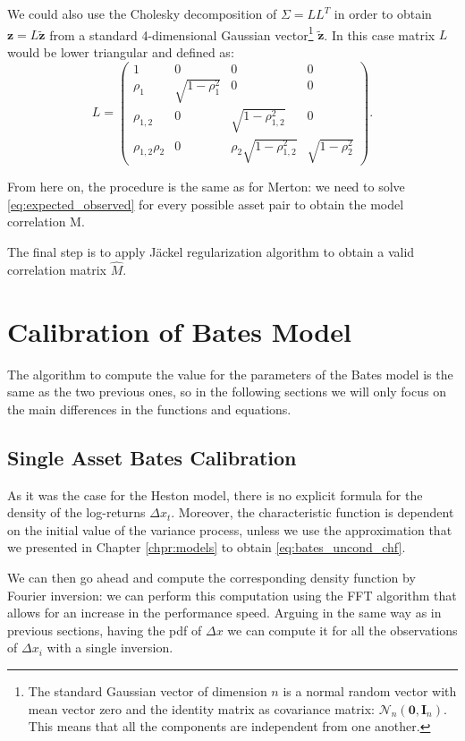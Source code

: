 We could also use the Cholesky decomposition of $\Sigma = L L^T$ in order to obtain $\mathbf{z} = L \mathbf{\tilde{z}}$ from a standard 4-dimensional Gaussian vector\footnote{The standard Gaussian vector of dimension $n$ is a normal random vector with mean vector zero and the identity matrix as covariance matrix: $\mathcal{N}_n (\mathbf{0}, \mathbf{I}_n)$. This means that all the components are independent from one another.} $\mathbf{\tilde{z}}$. In this case matrix $L$ would be lower triangular and defined as:
\begin{equation}
	L = \begin{pmatrix}
	1&0&0&0\\
	\rho_1 & \sqrt{1- \rho_1^2} &0&0\\
	\rho_{1,2} &0&\sqrt{1-\rho_{1,2}^2}&0\\
	\rho_{1,2}\rho_2 & 0& \rho_2 \sqrt{1-\rho_{1,2}^2}&\sqrt{1- \rho_2^2} 
	\end{pmatrix}.
\end{equation}

From here on, the procedure is the same as for Merton:
we need to solve \eqref{eq:expected_observed} for every possible asset pair to obtain the model correlation M.

The final step is to apply  J\"ackel regularization algorithm to obtain a valid correlation matrix $\widehat{M}$.

\section{Calibration of Bates Model}
The algorithm to compute the value for the parameters of the Bates model is the same as the two previous ones, so in the following sections we will only focus on the main differences in the functions and equations.

\subsection{Single Asset Bates Calibration}
As it was the case for the Heston model, there is no explicit formula for the density of the log-returns $\Delta x_t$. Moreover, the characteristic function is dependent on the initial value of the variance process, unless we use the approximation that we presented in Chapter \ref{chpr:models} to obtain \eqref{eq:bates_uncond_chf}.

We can then go ahead and compute the corresponding density function by Fourier inversion: we can perform this computation using the FFT algorithm that allows for an increase in the performance speed. 
Arguing in the same way as in previous sections, having the pdf of $\Delta x$ we can compute it for all the observations of $\Delta x_i$ with a single inversion.

